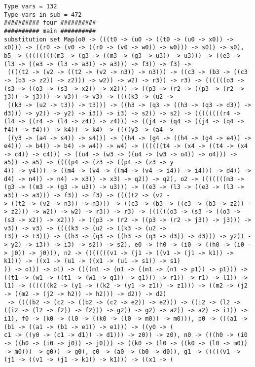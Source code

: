 \documentclass[11pt,oneside,a4paper]{report}
\begin{document}
\begin{lstlisting}[breaklines=true,caption={The output of an exponential type},label=lst:appedix:bigexp]
Type vars = 132
Type vars in sub = 472
########## four ##########
########## main ##########
substitution set Map(o0 -> (((t0 -> (u0 -> ((t0 -> (u0 -> x0)) -> x0))) -> ((r0 -> (v0 -> ((r0 -> (v0 -> w0)) -> w0))) -> s0)) -> s0), b5 -> (((((((((m3 -> (g3 -> ((m3 -> (g3 -> u3)) -> u3))) -> ((e3 -> (l3 -> ((e3 -> (l3 -> a3)) -> a3))) -> f3)) -> f3) ->
 ((((t2 -> (v2 -> ((t2 -> (v2 -> n3)) -> n3))) -> ((c3 -> (b3 -> ((c3 -> (b3 -> z2)) -> z2))) -> w2)) -> w2) -> r3)) -> r3) -> ((((((o3 -> (s3 -> ((o3 -> (s3 -> x2)) -> x2))) -> ((p3 -> (r2 -> ((p3 -> (r2 -> j3)) -> j3))) -> v3)) -> v3) -> ((((k3 -> (u2 ->
 ((k3 -> (u2 -> t3)) -> t3))) -> ((h3 -> (q3 -> ((h3 -> (q3 -> d3)) -> d3))) -> y2)) -> y2) -> i3)) -> i3) -> s2)) -> s2) -> ((((((((r4 -> (l4 -> ((r4 -> (l4 -> z4)) -> z4))) -> ((j4 -> (q4 -> ((j4 -> (q4 -> f4)) -> f4))) -> k4)) -> k4) -> ((((y3 -> (a4 ->
 ((y3 -> (a4 -> s4)) -> s4))) -> ((h4 -> (g4 -> ((h4 -> (g4 -> e4)) -> e4))) -> b4)) -> b4) -> w4)) -> w4) -> ((((((t4 -> (x4 -> ((t4 -> (x4 -> c4)) -> c4))) -> ((u4 -> (w3 -> ((u4 -> (w3 -> o4)) -> o4))) -> a5)) -> a5) -> ((((p4 -> (z3 -> ((p4 -> (z3 -> y
4)) -> y4))) -> ((m4 -> (v4 -> ((m4 -> (v4 -> i4)) -> i4))) -> d4)) -> d4) -> n4)) -> n4) -> x3)) -> x3) -> q2)) -> q2), o2 -> (((((((m3 -> (g3 -> ((m3 -> (g3 -> u3)) -> u3))) -> ((e3 -> (l3 -> ((e3 -> (l3 -> a3)) -> a3))) -> f3)) -> f3) -> ((((t2 -> (v2 -
> ((t2 -> (v2 -> n3)) -> n3))) -> ((c3 -> (b3 -> ((c3 -> (b3 -> z2)) -> z2))) -> w2)) -> w2) -> r3)) -> r3) -> ((((((o3 -> (s3 -> ((o3 -> (s3 -> x2)) -> x2))) -> ((p3 -> (r2 -> ((p3 -> (r2 -> j3)) -> j3))) -> v3)) -> v3) -> ((((k3 -> (u2 -> ((k3 -> (u2 ->
t3)) -> t3))) -> ((h3 -> (q3 -> ((h3 -> (q3 -> d3)) -> d3))) -> y2)) -> y2) -> i3)) -> i3) -> s2)) -> s2), e0 -> (h0 -> (i0 -> ((h0 -> (i0 -> j0)) -> j0))), n2 -> (((((((v1 -> (j1 -> ((v1 -> (j1 -> k1)) -> k1))) -> ((x1 -> (u1 -> ((x1 -> (u1 -> s1)) -> s1)
)) -> o1)) -> o1) -> ((((m1 -> (n1 -> ((m1 -> (n1 -> p1)) -> p1))) -> ((t1 -> (w1 -> ((t1 -> (w1 -> q1)) -> q1))) -> r1)) -> r1) -> l1)) -> l1) -> ((((((k2 -> (y1 -> ((k2 -> (y1 -> z1)) -> z1))) -> ((m2 -> (j2 -> ((m2 -> (j2 -> h2)) -> h2))) -> d2)) -> d2)
 -> ((((b2 -> (c2 -> ((b2 -> (c2 -> e2)) -> e2))) -> ((i2 -> (l2 -> ((i2 -> (l2 -> f2)) -> f2))) -> g2)) -> g2) -> a2)) -> a2) -> i1)) -> i1), f0 -> (k0 -> (l0 -> ((k0 -> (l0 -> m0)) -> m0))), p0 -> (((a1 -> (b1 -> ((a1 -> (b1 -> e1)) -> e1))) -> ((y0 -> (
c1 -> ((y0 -> (c1 -> d1)) -> d1))) -> z0)) -> z0), n0 -> (((h0 -> (i0 -> ((h0 -> (i0 -> j0)) -> j0))) -> ((k0 -> (l0 -> ((k0 -> (l0 -> m0)) -> m0))) -> g0)) -> g0), c0 -> (a0 -> (b0 -> d0)), g1 -> (((((v1 -> (j1 -> ((v1 -> (j1 -> k1)) -> k1))) -> ((x1 -> (

\end{lstlisting}
\end{document}
